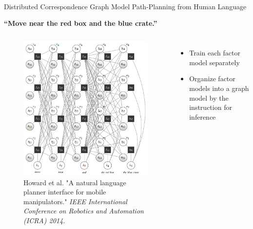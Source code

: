 

\begin{frame}{Distributed Correspondence Graph}{ Model Path-Planning from Human Language }
	
{\bf ``Move near the red box and the blue crate.''}
	
\begin{columns}
\begin{figure}
	\centering
	\includegraphics[width=.9\linewidth]{figure/DCG}
	\caption{ \tiny{ Howard et al. "A natural language planner interface for mobile manipulators." {\it IEEE International Conference on Robotics and Automation (ICRA) 2014.} } }
\end{figure}
\begin{itemize}
\item Train each factor model separately
\item Organize factor models into a graph model by the instruction for inference
\end{itemize}
\end{columns}

\end{frame}	

